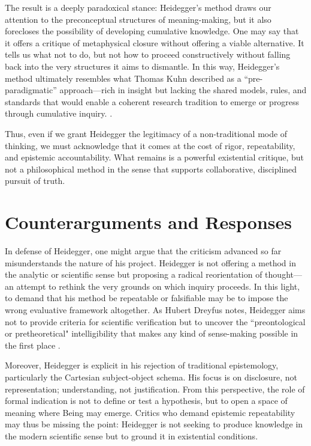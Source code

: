 \documentclass{article}
\begin{document}
The result is a deeply paradoxical stance: Heidegger's method draws our attention to the preconceptual structures of meaning-making, but it also forecloses the possibility of developing cumulative knowledge. One may say that it offers a critique of metaphysical closure without offering a viable alternative. It tells us what not to do, but not how to proceed constructively without falling back into the very structures it aims to dismantle. In this way, Heidegger’s method ultimately resembles what Thomas Kuhn described as a “pre-paradigmatic” approach—rich in insight but lacking the shared models, rules, and standards that would enable a coherent research tradition to emerge or progress through cumulative inquiry. \parencite[pp.~10-11]{kuhn1996}.

Thus, even if we grant Heidegger the legitimacy of a non-traditional mode of thinking, we must acknowledge that it comes at the cost of rigor, repeatability, and epistemic accountability. What remains is a powerful existential critique, but not a philosophical method in the sense that supports collaborative, disciplined pursuit of truth.

\section*{Counterarguments and Responses}

In defense of Heidegger, one might argue that the criticism advanced so far misunderstands the nature of his project. Heidegger is not offering a method in the analytic or scientific sense but proposing a radical reorientation of thought—an attempt to rethink the very grounds on which inquiry proceeds. In this light, to demand that his method be repeatable or falsifiable may be to impose the wrong evaluative framework altogether. As Hubert Dreyfus notes, Heidegger aims not to provide criteria for scientific verification but to uncover the “preontological or pretheoretical" intelligibility that makes any kind of sense-making possible in the first place \parencite[pp.~19--23]{dreyfus1991}.

Moreover, Heidegger is explicit in his rejection of traditional epistemology, particularly the Cartesian subject-object schema. His focus is on disclosure, not representation; understanding, not justification. From this perspective, the role of formal indication is not to define or test a hypothesis, but to open a space of meaning where Being may emerge. Critics who demand epistemic repeatability may thus be missing the point: Heidegger is not seeking to produce knowledge in the modern scientific sense but to ground it in existential conditions.
\end{document}
